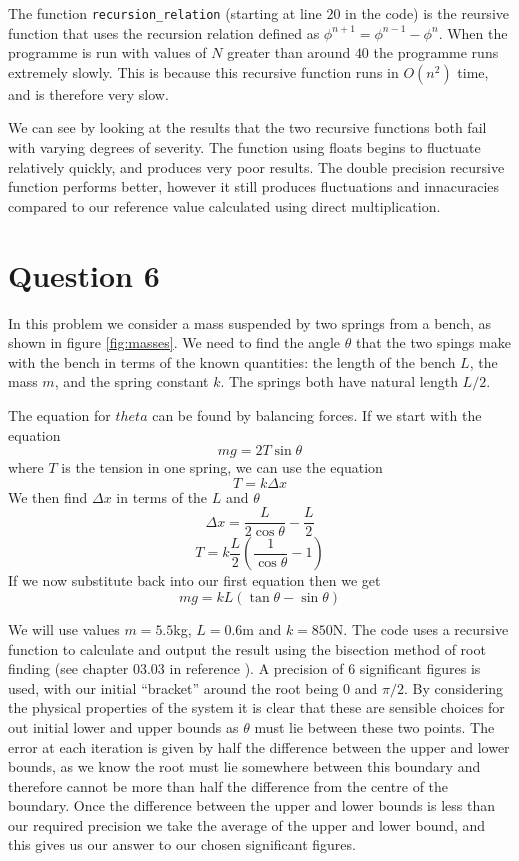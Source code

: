 \documentclass[a4paper,12pt]{UoBnote}
\begin{document}
The function \texttt{recursion\_relation} (starting at line $20$ in the code) is the reursive function that uses the recursion relation defined as $\phi^{n+1}=\phi^{n-1}-\phi^{n}$. When the programme is run with values of $N$ greater than around $40$ the programme runs extremely slowly. This is because this recursive function runs in $O(n^2)$ time, and is therefore very slow.

We can see by looking at the results that the two recursive functions both fail with varying degrees of severity. The function using floats begins to fluctuate relatively quickly, and produces very poor results. The double precision recursive function performs better, however it still produces fluctuations and innacuracies compared to our reference value calculated using direct multiplication.

\section{Question 6}

In this problem we consider a mass suspended by two springs from a bench, as shown in figure \ref{fig:masses}. We need to find the angle $\theta$ that the two spings make with the bench in terms of the known quantities: the length of the bench $L$, the mass $m$, and the spring constant $k$. The springs both have natural length $L/2$.

The equation for $theta$ can be found by balancing forces. If we start with the equation \[mg=2T\sin{\theta}\] where $T$ is the tension in one spring, we can use the equation \[T=k\Delta x\] We then find $\Delta x$ in terms of the $L$ and $\theta$ \[\Delta x=\frac{L}{2\cos{\theta}}-\frac{L}{2}\] \[T=k\frac{L}{2}(\frac{1}{\cos{\theta}}-1)\] If we now substitute back into our first equation then we get \[mg=kL(\tan{\theta}-\sin{\theta})\]

We will use values $m=5.5$kg, $L=0.6$m and $k=850$N. The code uses a recursive function to calculate and output the result using the bisection method of root finding (see chapter 03.03 in reference \cite{holistic}). A precision of 6 significant figures is used, with our initial ``bracket'' around the root being $0$ and $\pi/2$. By considering the physical properties of the system it is clear that these are sensible choices for out initial lower and upper bounds as $\theta$ must lie between these two points. The error at each iteration is given by half the difference between the upper and lower bounds, as we know the root must lie somewhere between this boundary and therefore cannot be more than half the difference from the centre of the boundary. Once the difference between the upper and lower bounds is less than our required precision we take the average of the upper and lower bound, and this gives us our answer to our chosen significant figures. 
\end{document}
